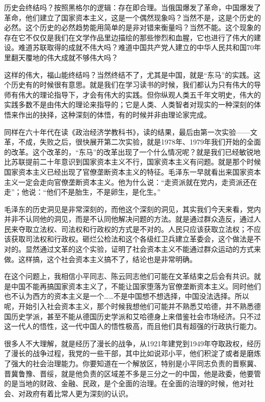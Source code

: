 \documentclass[UTF8, 12pt, a4paper]{ctexrep}
\begin{document}
历史会终结吗？按照黑格尔的逻辑：存在即合理。当俄国爆发了革命，中国爆发了革命，他们建立了国家资本主义，这是一个偶然现象吗？当然不是，这是个历史的必然。这个历史的必然趋势能用简单的是非对错来衡量吗？当然不能。这个现象的存在它不仅仅是我们在文学作品里边描绘的那些惨烈和血腥，它也进行了伟大的建设。难道苏联取得的成就不伟大吗？难道中国共产党人建立的中华人民共和国70年里翻天覆地的伟大成就不够伟大吗？

这样的伟大，福山能终结吗？当然终结不了，尤其是中国，就是“东马”的实践。这个历史有的时候很有意思。就是我们在学习读书的时候，我们都认为只有伟大的导师有伟大的理论指导下，才会有伟大的实践。但你纵观人类五千年文明史，伟大的实践多数不是由伟大的理论来指导的；它是人类、人类智者对现实的一种深刻的体悟来作出的抉择，这种深刻的体悟，有的时候并非由理论家完成。

同样在六十年代在读《政治经济学教科书》，读的结果，最后由第一次实验——文革，不成，失败之后，很快展开第二次实验，就是1978年、1979年我们开始的全面的改革。这个改革的，“东马”的改革出现了一个什么情况呢？就是我们已经敏锐地比苏联提前二十年意识到国家资本主义不行，国家资本主义有问题。就是那个时候国家资本主义已经出现了官僚垄断资本主义的特征。毛泽东一早就看出来国家资本主义一定会走向官僚垄断资本主义。他为什么说：“走资派就在党内，走资派还在走”；他说：“他们不是胎生，不是卵生，是化生。”

毛泽东的历史洞见是非常深刻的，而他这个深刻的洞见，其实我们今天来看，党内并非不认同他的洞见，而是不认同他解决问题的方法。就是通过群众造反，通过人民来夺取立法权、司法权和行政权的方式是不对的。人民只应该获取立法权；不应该获取司法权和行政权。砸烂公检法和这个各级红卫兵建立革委会，这个做法是不对的。显然通过文革的这个实验，证明了社会资本主义不能通过群众运动的方式来做。这样搞，这个社会资本主义搞不了，结论也是非常明确。

在这个问题上，我相信小平同志、陈云同志他们可能在文革结束之后会有共识。就是中国不能再搞国家资本主义了，不能让国家堕落为官僚垄断资本主义。同时他们也不认为西方的资本主义是一个……不是中国想不想选择，中国没法选择。所以呢，开始引入社会资本主义，那个时候我想他们可能并不熟悉艾哈德，并不熟悉德国历史学派，甚至不能从德国历史学派和艾哈德身上来借鉴社会市场经济。只不过这一代人的悟性，这一代中国人的悟性极高，而且他们具有超强的行政执行能力。

很多人不大理解，就是经历了漫长的战争，从1921年建党到1949年夺取政权，经历了漫长的战争过程，我党的一些干部，其中比如说邓小平，他们积淀了或者是磨炼了强大的社会治理能力。你要知道在一个解放区，特别是小平同志负责的晋察冀、晋冀鲁豫、晋绥，就是他负责的区域差不多是三分之一的中国，他是政委，他要管的是当地的财政、金融、民政，是个全面的治理。在全面的治理的时候，他对社会、对政府有着比常人更为深刻的认识。
\end{document}
